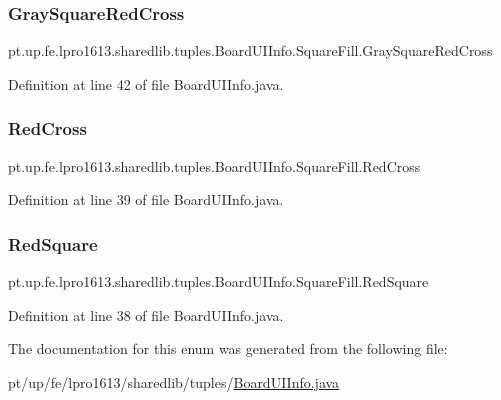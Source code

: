 \subsubsection{\texorpdfstring{Gray\+Square\+Red\+Cross}{GraySquareRedCross}}
{\footnotesize\ttfamily pt.\+up.\+fe.\+lpro1613.\+sharedlib.\+tuples.\+Board\+U\+I\+Info.\+Square\+Fill.\+Gray\+Square\+Red\+Cross}



Definition at line 42 of file Board\+U\+I\+Info.\+java.

\hypertarget{enumpt_1_1up_1_1fe_1_1lpro1613_1_1sharedlib_1_1tuples_1_1_board_u_i_info_1_1_square_fill_a0f63a4642657ee658d936a9b2a84b087}{}\label{enumpt_1_1up_1_1fe_1_1lpro1613_1_1sharedlib_1_1tuples_1_1_board_u_i_info_1_1_square_fill_a0f63a4642657ee658d936a9b2a84b087} 
\subsubsection{\texorpdfstring{Red\+Cross}{RedCross}}
{\footnotesize\ttfamily pt.\+up.\+fe.\+lpro1613.\+sharedlib.\+tuples.\+Board\+U\+I\+Info.\+Square\+Fill.\+Red\+Cross}



Definition at line 39 of file Board\+U\+I\+Info.\+java.

\hypertarget{enumpt_1_1up_1_1fe_1_1lpro1613_1_1sharedlib_1_1tuples_1_1_board_u_i_info_1_1_square_fill_a7d344f869733c45dc5ae75ea84b2ac60}{}\label{enumpt_1_1up_1_1fe_1_1lpro1613_1_1sharedlib_1_1tuples_1_1_board_u_i_info_1_1_square_fill_a7d344f869733c45dc5ae75ea84b2ac60} 
\subsubsection{\texorpdfstring{Red\+Square}{RedSquare}}
{\footnotesize\ttfamily pt.\+up.\+fe.\+lpro1613.\+sharedlib.\+tuples.\+Board\+U\+I\+Info.\+Square\+Fill.\+Red\+Square}



Definition at line 38 of file Board\+U\+I\+Info.\+java.



The documentation for this enum was generated from the following file\+:\begin{DoxyCompactItemize}
\item 
pt/up/fe/lpro1613/sharedlib/tuples/\hyperlink{_board_u_i_info_8java}{Board\+U\+I\+Info.\+java}\end{DoxyCompactItemize}

